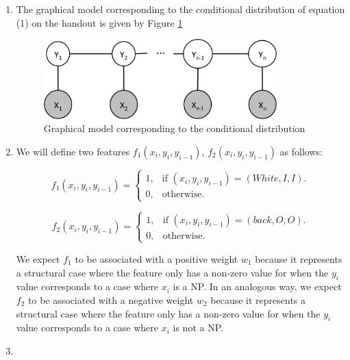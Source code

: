 \documentclass{article}
\begin{document}
\begin{enumerate}

\item
The graphical model corresponding to the conditional distribution of equation (1) on the handout is given by Figure \ref{meanfieldmodel}\\

\begin{figure}[ht!]
\centering
\includegraphics[width=90mm]{3_1.png}
\caption{Graphical model corresponding to the conditional distribution}
\label{meanfieldmodel}
\end{figure}


\item
We will define two features $f_1(x_i,y_i,y_{i-1})$, $f_2(x_i,y_i,y_{i-1})$ as follows:

\begin{equation*}
f_1(x_i,y_i,y_{i-1})=\begin{cases}
    1, & \text{if $(x_i,y_i,y_{i-1})=(White, I, I)$}.\\
    0, & \text{otherwise}.
  \end{cases}
\end{equation*}

\begin{equation*}
f_2(x_i,y_i,y_{i-1})=\begin{cases}
    1, & \text{if $(x_i,y_i,y_{i-1})=(back, O, O)$}.\\
    0, & \text{otherwise}.
  \end{cases}
\end{equation*}

We expect $f_1$ to be associated with a positive weight $w_1$ because it represents a structural case where the feature only has a non-zero value for when the $y_i$ value corresponds to a case where $x_i$ is a NP.
In an analogous way, we expect $f_2$ to be associated with a negative weight $w_2$ because it represents a structural case where the feature only has a non-zero value for when the $y_i$ value corresponds to a case where $x_i$ is not a NP.

\item


\end{enumerate}
\end{document}
